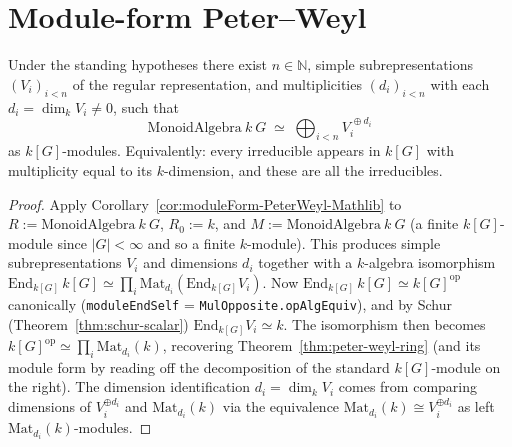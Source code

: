 \section{Module-form Peter–Weyl}

\begin{theorem}
  \label{thm:peter-weyl-module}
  \leanok
  Under the standing hypotheses there exist $n \in \mathbb N$, simple
  subrepresentations $(V_i)_{i < n}$ of the regular representation, and
  multiplicities $(d_i)_{i < n}$ with each $d_i = \dim_k V_i \ne 0$, such
  that
  \[
     \mathrm{MonoidAlgebra}\ k\ G \;\simeq\; \bigoplus_{i < n} V_i^{\,\oplus d_i}
  \]
  as $k[G]$-modules. Equivalently: every irreducible appears in $k[G]$ with
  multiplicity equal to its $k$-dimension, and these are all the irreducibles.
\end{theorem}

\begin{proof}\leanok
  Apply Corollary~\ref{cor:moduleForm-PeterWeyl-Mathlib} to
  $R := \mathrm{MonoidAlgebra}\ k\ G$, $R_0 := k$, and
  $M := \mathrm{MonoidAlgebra}\ k\ G$ (a finite $k[G]$-module since
  $|G| < \infty$ and so a finite $k$-module). This produces simple
  subrepresentations $V_i$ and dimensions $d_i$ together with a
  $k$-algebra isomorphism
  $\mathrm{End}_{k[G]}\,k[G] \simeq \prod_i \mathrm{Mat}_{d_i}(\mathrm{End}_{k[G]} V_i)$.
  Now $\mathrm{End}_{k[G]}\,k[G] \simeq k[G]^{\mathrm{op}}$ canonically
  (\texttt{moduleEndSelf} = \texttt{MulOpposite.opAlgEquiv}), and by Schur
  (Theorem~\ref{thm:schur-scalar})
  $\mathrm{End}_{k[G]} V_i \simeq k$. The isomorphism then becomes
  $k[G]^{\mathrm{op}} \simeq \prod_i \mathrm{Mat}_{d_i}(k)$, recovering
  Theorem~\ref{thm:peter-weyl-ring} (and its module form by reading off the
  decomposition of the standard $k[G]$-module on the right). The dimension
  identification $d_i = \dim_k V_i$ comes from comparing dimensions of
  $V_i^{\oplus d_i}$ and $\mathrm{Mat}_{d_i}(k)$ via the equivalence
  $\mathrm{Mat}_{d_i}(k) \cong V_i^{\oplus d_i}$ as left $\mathrm{Mat}_{d_i}(k)$-modules.
\end{proof}



